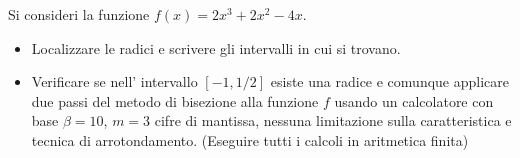 Si consideri la funzione $f(x)=2x^3+2x^2-4x$.
\begin{itemize}
\item  Localizzare le radici e
scrivere gli intervalli in cui si trovano.
\item Verificare se nell' intervallo $[-1, 1/2]$ esiste una radice e comunque applicare due passi del
metodo di bisezione alla funzione $f$ usando un calcolatore con
base $\beta =10$, $m=3$ cifre di mantissa, nessuna limitazione
sulla caratteristica e tecnica di arrotondamento. (Eseguire tutti
i calcoli in aritmetica finita)
\end{itemize}
